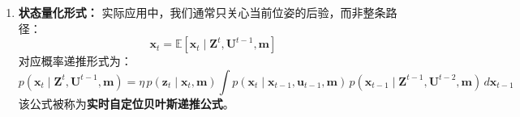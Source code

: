 \documentclass[../main.tex]{subfiles}
\begin{document}
\begin{enumerate}
\begin{enumerate}
{\begin{enumerate}
        
        \item \textbf{状态量化形式：}
        实际应用中，我们通常只关心当前位姿的后验，而非整条路径：
        \[
        \mathbf{x}_t = \mathbb{E}\left[\mathbf{x}_t \mid \mathbf{Z}^{t}, \mathbf{U}^{t-1}, \mathbf{m}\right]
        \]
        对应概率递推形式为：
        \[
        p(\mathbf{x}_t \mid \mathbf{Z}^{t}, \mathbf{U}^{t-1}, \mathbf{m})
        = \eta \, p(\mathbf{z}_t \mid \mathbf{x}_t, \mathbf{m})
        \int p(\mathbf{x}_t \mid \mathbf{x}_{t-1}, \mathbf{u}_{t-1}, \mathbf{m})
        \, p(\mathbf{x}_{t-1} \mid \mathbf{Z}^{t-1}, \mathbf{U}^{t-2}, \mathbf{m})
        \, d\mathbf{x}_{t-1}
        \]
        该公式被称为\textbf{实时自定位贝叶斯递推公式}。
        
        \end{enumerate}
        }
    \end{enumerate}
\end{enumerate}
\end{document}
